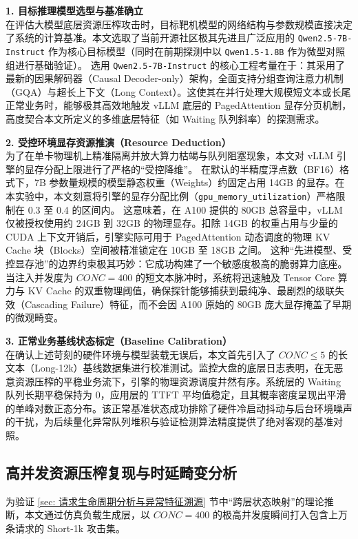 \documentclass[master, vlined]{DissertUESTC}
\begin{document}
	\textbf{1. 目标推理模型选型与基准确立} \\
	在评估大模型底层资源压榨攻击时，目标靶机模型的网络结构与参数规模直接决定了系统的计算基准。本文选取了当前开源社区极其先进且广泛应用的 \texttt{Qwen2.5-7B-Instruct} 作为核心目标模型（同时在前期探测中以 \texttt{Qwen1.5-1.8B} 作为微型对照组进行基础验证）。
	选用 \texttt{Qwen2.5-7B-Instruct} 的核心工程考量在于：其采用了最新的因果解码器（Causal Decoder-only）架构，全面支持分组查询注意力机制（GQA）与超长上下文（Long Context）。这使其在并行处理大规模短文本或长尾正常业务时，能够极其高效地触发 vLLM 底层的 PagedAttention 显存分页机制，高度契合本文所定义的多维底层特征（如 Waiting 队列斜率）的探测需求。

	\textbf{2. 受控环境显存资源推演（Resource Deduction）} \\
	为了在单卡物理机上精准隔离并放大算力枯竭与队列阻塞现象，本文对 vLLM 引擎的显存分配上限进行了严格的“受控降维”。
	在默认的半精度浮点数（BF16）格式下，7B 参数量规模的模型静态权重（Weights）约固定占用 14GB 的显存。在本实验中，本文刻意将引擎的显存分配比例（\texttt{gpu\_memory\_utilization}）严格限制在 0.3 至 0.4 的区间内。
	这意味着，在 A100 提供的 80GB 总容量中，vLLM 仅被授权使用约 24GB 到 32GB 的物理显存。扣除 14GB 的权重占用与少量的 CUDA 上下文开销后，引擎实际可用于 PagedAttention 动态调度的物理 KV Cache 块（Blocks）空间被精准锁定在 10GB 至 18GB 之间。
	这种“先进模型、受控显存池”的边界约束极其巧妙：它成功构建了一个敏感度极高的脆弱算力底座。当注入并发度为 $CONC=400$ 的短文本脉冲时，系统将迅速触及 Tensor Core 算力与 KV Cache 的双重物理阈值，确保探针能够捕获到最纯净、最剧烈的级联失效（Cascading Failure）特征，而不会因 A100 原始的 80GB 庞大显存掩盖了早期的微观畸变。

	\textbf{3. 正常业务基线状态标定（Baseline Calibration）} \\
	在确认上述苛刻的硬件环境与模型装载无误后，本文首先引入了 $CONC \le 5$ 的长文本（Long-12k）基线数据集进行校准测试。监控大盘的底层日志表明，在无恶意资源压榨的平稳业务流下，引擎的物理资源调度井然有序。系统层的 Waiting 队列长期平稳保持为 0，应用层的 TTFT 平均值稳定，且其概率密度呈现出平滑的单峰对数正态分布。该正常基准状态成功排除了硬件冷启动抖动与后台环境噪声的干扰，为后续量化异常队列堆积与验证检测算法精度提供了绝对客观的基准对照。

	\subsection{高并发资源压榨复现与时延畸变分析}
	为验证 \ref{sec: 请求生命周期分析与异常特征溯源} 节中“跨层状态映射”的理论推断，本文通过仿真负载生成层，以 $CONC=400$ 的极高并发度瞬间打入包含上万条请求的 Short-1k 攻击集。
\end{document}
